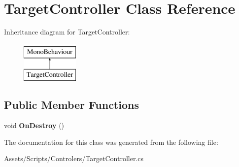 \hypertarget{class_target_controller}{}\section{Target\+Controller Class Reference}
\label{class_target_controller}
Inheritance diagram for Target\+Controller\+:\begin{figure}[H]
\begin{center}
\leavevmode
\includegraphics[height=2.000000cm]{class_target_controller}
\end{center}
\end{figure}
\subsection*{Public Member Functions}
\begin{DoxyCompactItemize}
\item 
void {\bfseries On\+Destroy} ()\hypertarget{class_target_controller_a3f8c8d02ceb9fedeff04f8edf2f9a63d}{}\label{class_target_controller_a3f8c8d02ceb9fedeff04f8edf2f9a63d}

\end{DoxyCompactItemize}


The documentation for this class was generated from the following file\+:\begin{DoxyCompactItemize}
\item 
Assets/\+Scripts/\+Controlers/Target\+Controller.\+cs\end{DoxyCompactItemize}
